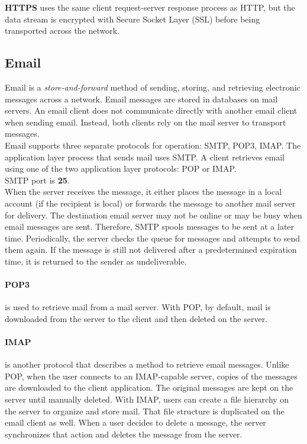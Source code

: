 \textbf{HTTPS} uses the same client request-server response process as HTTP, but the data stream is encrypted with Secure Socket Layer (SSL) before being transported across the network.

\subsection{Email}

Email is a \emph{store-and-forward} method of sending, storing, and retrieving electronic messages across a network. Email messages are stored in databases on mail servers. An email client does not communicate directly with another email client when sending email. Instead, both clients rely on the mail server to transport messages. \\

Email supports three separate protocols for operation: SMTP, POP3, IMAP. The application layer process that sends mail uses SMTP. A client retrieves email using one of the two application layer protocols: POP or IMAP.\\

SMTP port is \textbf{25}. \\

When the server receives the message, it either places the message in a local account (if the recipient is local) or forwards the message to another mail server for delivery. The destination email server may not be online or may be busy when email messages are sent. Therefore, SMTP spools messages to be sent at a later time. Periodically, the server checks the queue for messages and attempts to send them again. If the message is still not delivered after a predetermined expiration time, it is returned to the sender as undeliverable. \\

\paragraph{POP3} is used to retrieve mail from a mail server. With POP, by default, mail is downloaded from the server to the client and then deleted on the server. 

\paragraph{IMAP} is another protocol that describes a method to retrieve email messages. Unlike POP, when the user connects to an IMAP-capable server, copies of the messages are downloaded to the client application.  The original messages are kept on the server until manually deleted. With IMAP, users can create a file hierarchy on the server to organize and store mail. That file structure is duplicated on the email client as well. When a user decides to delete a message, the server synchronizes that action and deletes the message from the server.

